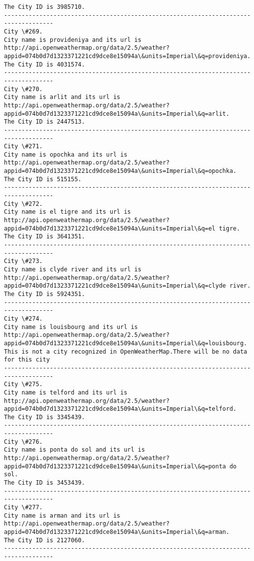 \documentclass[11pt]{article}
\begin{document}
\begin{Verbatim}[commandchars=\\\{\}]
The City ID is 3985710.
------------------------------------------------------------------------------------
City \#269.
City name is provideniya and its url is http://api.openweathermap.org/data/2.5/weather?appid=074b0d7d1323371221cd9dce8e15094a\&units=Imperial\&q=provideniya.
The City ID is 4031574.
------------------------------------------------------------------------------------
City \#270.
City name is arlit and its url is http://api.openweathermap.org/data/2.5/weather?appid=074b0d7d1323371221cd9dce8e15094a\&units=Imperial\&q=arlit.
The City ID is 2447513.
------------------------------------------------------------------------------------
City \#271.
City name is opochka and its url is http://api.openweathermap.org/data/2.5/weather?appid=074b0d7d1323371221cd9dce8e15094a\&units=Imperial\&q=opochka.
The City ID is 515155.
------------------------------------------------------------------------------------
City \#272.
City name is el tigre and its url is http://api.openweathermap.org/data/2.5/weather?appid=074b0d7d1323371221cd9dce8e15094a\&units=Imperial\&q=el tigre.
The City ID is 3641351.
------------------------------------------------------------------------------------
City \#273.
City name is clyde river and its url is http://api.openweathermap.org/data/2.5/weather?appid=074b0d7d1323371221cd9dce8e15094a\&units=Imperial\&q=clyde river.
The City ID is 5924351.
------------------------------------------------------------------------------------
City \#274.
City name is louisbourg and its url is http://api.openweathermap.org/data/2.5/weather?appid=074b0d7d1323371221cd9dce8e15094a\&units=Imperial\&q=louisbourg.
This is not a city recognized in OpenWeatherMap.There will be no data for this city
------------------------------------------------------------------------------------
City \#275.
City name is telford and its url is http://api.openweathermap.org/data/2.5/weather?appid=074b0d7d1323371221cd9dce8e15094a\&units=Imperial\&q=telford.
The City ID is 3345439.
------------------------------------------------------------------------------------
City \#276.
City name is ponta do sol and its url is http://api.openweathermap.org/data/2.5/weather?appid=074b0d7d1323371221cd9dce8e15094a\&units=Imperial\&q=ponta do sol.
The City ID is 3453439.
------------------------------------------------------------------------------------
City \#277.
City name is arman and its url is http://api.openweathermap.org/data/2.5/weather?appid=074b0d7d1323371221cd9dce8e15094a\&units=Imperial\&q=arman.
The City ID is 2127060.
------------------------------------------------------------------------------------

\end{Verbatim}
\end{document}
